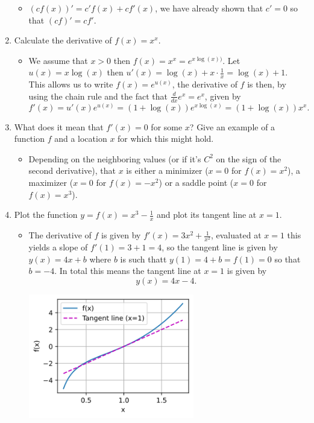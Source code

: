 \documentclass{article}
\begin{document}
\begin{enumerate}
	\begin{itemize}
	\item $(cf(x))' = c' f(x) + c f'(x)$, we have already shown that $c' = 0$ so that $(cf)' = cf'$.
	\end{itemize}
\item Calculate the derivative of $f(x) = x^x$. 
	\begin{itemize}
	\item We assume that $x > 0$ then $f(x) = x^x = e^{x \log(x))}$. Let $u(x) = x \log(x)$ then $u'(x) = \log(x) + x \cdot \frac{1}{x} = \log(x) + 1$. This allows us to write $f(x) = e^{u(x)}$, the derivative of $f$ is then, by using the chain rule and the fact that $\frac{d}{dx} e^x = e^x$, given by
	$$
	f'(x) = u'(x) e^{u(x)} = (1 + \log(x))e^{x \log(x)} = (1 + \log(x))x^x.
	$$
	\end{itemize}
\item What does it mean that $f'(x) = 0$ for some $x$? Give an example of a function $f$ and a location $x$ for which this might hold.
	\begin{itemize}
	\item Depending on the neighboring values (or if it's $C^2$ on the sign of the second derivative), that $x$ is either a minimizer ($x = 0$ for $f(x) = x^2$), a maximizer ($x = 0$ for $f(x) = -x^2$) or a saddle point ($x = 0$ for $f(x) = x^3$).
	\end{itemize}
\item Plot the function $y = f(x) = x^3 - \frac{1}{x}$ and plot its tangent line at $x = 1$.
	\begin{itemize}
	\item The derivative of $f$ is given by $f'(x) = 3x^2 + \frac{1}{x^2}$, evaluated at $x = 1$ this yields a slope of $f'(1) = 3 + 1 = 4$, so the tangent line is given by $y(x) = 4x + b$ where $b$ is such thatt $y(1) = 4 + b = f(1) = 0$ so that $b = -4$. In total this means the tangent line at $x = 1$ is given by
	$$
	y(x) = 4x - 4.
	$$
	\begin{center}
    	\includegraphics[width=0.6\textwidth]{Images/2_4_6.png}

\end{center}
\end{itemize}
\end{enumerate}
\end{document}
